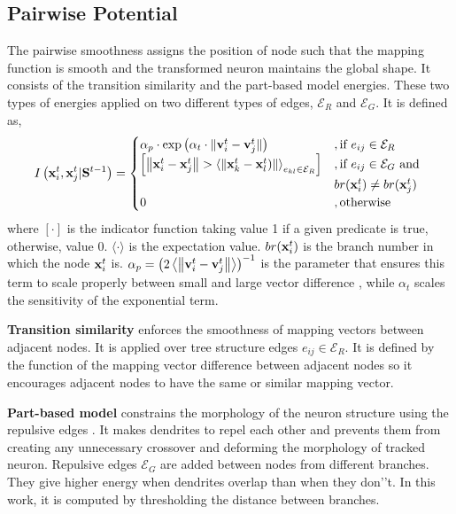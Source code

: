 \documentclass{article}
\begin{document}
\subsection{Pairwise Potential} \label{sec:pairwise_pot}
The pairwise smoothness assigns the position of node such that the mapping function is smooth and the transformed neuron maintains the global shape. It consists of the transition similarity and the part-based model energies. These two types of energies applied on two different types of edges, $\mathcal{E}_R$ and $\mathcal{E}_G$. It is defined as,
\begin{equation} \label{eq:pairwise}
I\left({\bf x}_i^t,{\bf x}_j^t | {\bf S}^{t-1}\right) =
\begin{cases}
\alpha_p \cdot \exp \left( \alpha_t \cdot \| {\bf v}_i^t - {\bf v}_j^t \| \right) 
&, \mbox{if } e_{ij} \in \mathcal{E}_R \\
\left[ \left\| {\bf x}_i^t - {\bf x}_j^t \right\| > \left\langle \left\| {\bf x}_k^t - {\bf x}_l^t) \right\| \right\rangle_{e_{kl} \in \mathcal{E}_R} \right]
&, \mbox{if } e_{ij} \in \mathcal{E}_G \mbox{ and } \\
& br({\bf x}_i^t) \neq br({\bf x}_j^t) \\
0 &, \mbox{otherwise}
\end{cases}
\end{equation}
where $[\cdot]$ is the indicator function taking value 1 if a given predicate is true, otherwise, value 0. $\langle \cdot \rangle$ is the expectation value. $br({\bf x}_i^t)$ is the branch number in which the node ${\bf x}_i^t$ is. $\alpha_p = \left( 2 \left\langle \left\| {\bf v}_i^t - {\bf v}_j^t \right\| \right\rangle \right)^{-1}$ is the parameter that ensures this term to scale properly between small and large vector difference \cite{Boykov2001b}, while $\alpha_t$ scales the sensitivity of the exponential term.

{\bf Transition similarity} enforces the smoothness of mapping vectors between adjacent nodes. It is applied over tree structure edges $e_{ij} \in \mathcal{E}_R$. It is defined by the function of the mapping vector difference between adjacent nodes so it encourages adjacent nodes to have the same or similar mapping vector.

{\bf Part-based model} constrains the morphology of the neuron structure using the repulsive edges \cite{Ferrari2009}. It makes dendrites to repel each other and prevents them from creating any unnecessary crossover and deforming the morphology of tracked neuron. Repulsive edges $\mathcal{E}_G$ are added between nodes from different branches. They give higher energy when dendrites overlap than when they don'’t. In this work, it is computed by thresholding the distance between branches.
\end{document}
